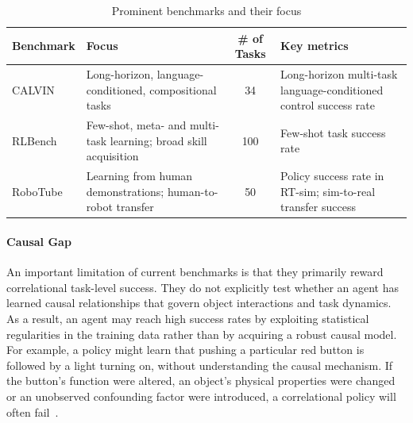 \begin{table}[htbp]
	\centering
	\small
	\begin{tabular}{|m{2.4cm}|m{5.9cm}|c|m{4.3cm}|}
		\hline
		\rowcolor{blue!10}
		\textbf{Benchmark} & \textbf{Focus} & \textbf{\# of Tasks} & \textbf{Key metrics} \\
		\hline
		CALVIN~\cite{Mees2021CALVINAB} & Long-horizon, language-conditioned, compositional tasks & 34 & Long-horizon multi-task language-conditioned control success rate \\
		\hline
		RLBench~\cite{James2019RLBenchTR} & Few-shot, meta- and multi-task learning; broad skill acquisition & 100 & Few-shot task success rate \\
		\hline
		RoboTube~\cite{Xiong2022RoboTubeLH} & Learning from human demonstrations; human-to-robot transfer & 50 & Policy success rate in RT-sim; sim-to-real transfer success \\
		\hline
	\end{tabular}
    \caption{Prominent benchmarks and their focus}
	\label{tab:benchmark}
\end{table}

\paragraph{Causal Gap} 
An important limitation of current benchmarks is that they primarily reward correlational task-level success. They do not explicitly test whether an agent has learned causal relationships that govern object interactions and task dynamics. As a result, an agent may reach high success rates by exploiting statistical regularities in the training data rather than by acquiring a robust causal model. For example, a policy might learn that pushing a particular red button is followed by a light turning on, without understanding the causal mechanism. If the button's function were altered, an object's physical properties were changed or an unobserved confounding factor were introduced, a correlational policy will often fail~\cite{Eze2024LearningBW}. 

